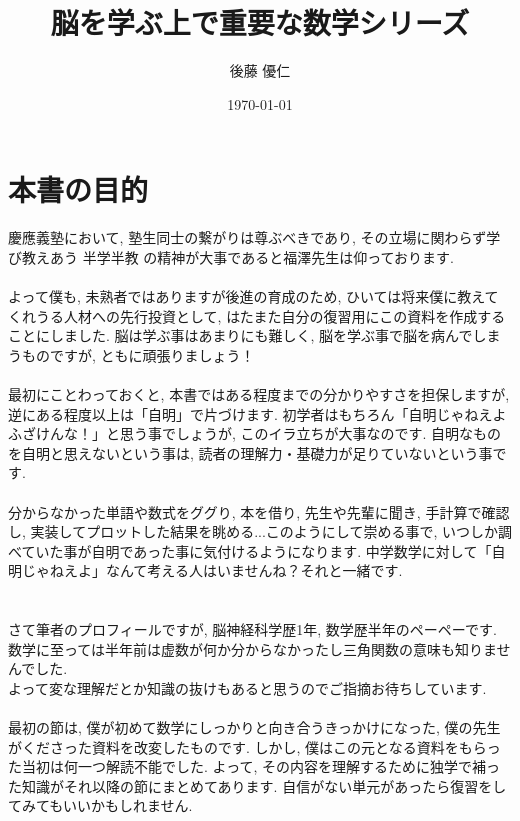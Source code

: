 \documentclass[11pt,a4paper]{jreport}
\title{脳を学ぶ上で重要な数学シリーズ}
\author{後藤 優仁}
\date{\today}
\begin{document}
\maketitle
%
%
\tableofcontents


\section{本書の目的}
慶應義塾において, 塾生同士の繋がりは尊ぶべきであり, その立場に関わらず学び教えあう 半学半教 の精神が大事であると福澤先生は仰っております. \\
\\
よって僕も, 未熟者ではありますが後進の育成のため, ひいては将来僕に教えてくれうる人材への先行投資として, はたまた自分の復習用にこの資料を作成することにしました. 脳は学ぶ事はあまりにも難しく, 脳を学ぶ事で脳を病んでしまうものですが, ともに頑張りましょう！ \\
\\
最初にことわっておくと, 本書ではある程度までの分かりやすさを担保しますが, 逆にある程度以上は「自明」で片づけます. 初学者はもちろん「自明じゃねえよふざけんな！」と思う事でしょうが, このイラ立ちが大事なのです. 自明なものを自明と思えないという事は, 読者の理解力・基礎力が足りていないという事です. \\\\
分からなかった単語や数式をググり, 本を借り, 先生や先輩に聞き, 手計算で確認し, 実装してプロットした結果を眺める...このようにして崇める事で, いつしか調べていた事が自明であった事に気付けるようになります. 中学数学に対して「自明じゃねえよ」なんて考える人はいませんね？それと一緒です.\\
\\
\\
さて筆者のプロフィールですが, 脳神経科学歴1年, 数学歴半年のペーペーです. 数学に至っては半年前は虚数が何か分からなかったし三角関数の意味も知りませんでした.\\
よって変な理解だとか知識の抜けもあると思うのでご指摘お待ちしています.\\
\\
最初の節は, 僕が初めて数学にしっかりと向き合うきっかけになった, 僕の先生がくださった資料を改変したものです. しかし, 僕はこの元となる資料をもらった当初は何一つ解読不能でした. よって, その内容を理解するために独学で補った知識がそれ以降の節にまとめてあります. 自信がない単元があったら復習をしてみてもいいかもしれません. \\
\\
\end{document}
